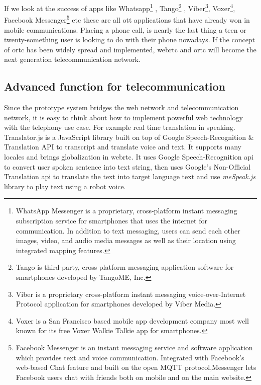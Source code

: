 \par If we look at the success of apps like Whatsapp\footnote{WhatsApp Messenger is a proprietary, cross-platform instant messaging subscription service for smartphones that uses the internet for communication. In addition to text messaging, users can send each other images, video, and audio media messages as well as their location using integrated mapping features.} , Tango\footnote{Tango is third-party, cross platform messaging application software for smartphones developed by TangoME, Inc.} , Viber\footnote{Viber is a proprietary cross-platform instant messaging voice-over-Internet Protocol application for smartphones developed by Viber Media.}, Voxer\footnote{Voxer is a San Francisco based mobile app development company most well known for its free Voxer Walkie Talkie app for smartphones.}, Facebook Messenger\footnote{Facebook Messenger is an instant messaging service and software application which provides text and voice communication. Integrated with Facebook's web-based Chat feature and built on the open MQTT protocol,Messenger lets Facebook users chat with friends both on mobile and on the main website.} etc these are all \gls{ott} applications that have already won in mobile communications. Placing a phone call, is nearly the last thing a teen or twenty-something user is looking to do with their phone nowadays.\cite{web:ott_com} If the concept of \gls{ortc} has been widely spread and implemented, \gls{webrtc} and \gls{ortc} will become the next generation telecommunication network.

\subsection{Advanced function for telecommunication}

\par Since the prototype system bridges the web network and telecommunication network, it is easy to think about how to implement powerful web technology with the telephony use case. For example real time translation in speaking. Translator.js is a JavaScript library built on top of Google Speech-Recognition \& Translation API to transcript and translate voice and text. It supports many locales and brings globalization in \gls{webrtc}.\cite{github:translatorjs} It uses Google Speech-Recognition \gls{api} to convert user spoken sentence into text string, then uses Google's Non-Official Translation \gls{api} to translate the text into target language text and use \textit{meSpeak.js} library to play text using a robot voice.

